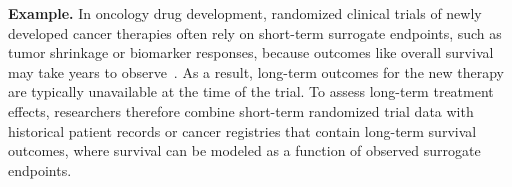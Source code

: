 \documentclass{article}
\theoremstyle{plain}
\theoremstyle{definition}
\theoremstyle{remark}
\newcommand{\1}{\mathds{1}}                %
\begin{document}
\textbf{Example.} In oncology drug development, randomized clinical trials of newly developed cancer therapies often rely on short-term surrogate endpoints, such as tumor shrinkage or biomarker responses, because outcomes like overall survival may take years to observe~\cite{Belin.2020}. As a result, long-term outcomes for the new therapy are typically unavailable at the time of the trial. To assess long-term treatment effects, researchers therefore combine short-term randomized trial data with historical patient records or cancer registries that contain long-term survival outcomes, where survival can be modeled as a function of observed surrogate endpoints.



\end{document}
